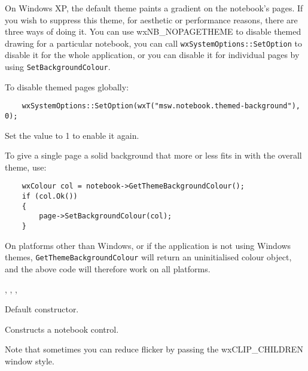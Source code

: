 
On Windows XP, the default theme paints a gradient on the notebook's pages.
If you wish to suppress this theme, for aesthetic or performance reasons,
there are three ways of doing it. You can use wxNB\_NOPAGETHEME to disable
themed drawing for a particular notebook, you can call {\tt wxSystemOptions::SetOption}
to disable it for the whole application, or you can disable it for individual
pages by using {\tt SetBackgroundColour}.

To disable themed pages globally:

\begin{verbatim}
    wxSystemOptions::SetOption(wxT("msw.notebook.themed-background"), 0);
\end{verbatim}

Set the value to 1 to enable it again.

To give a single page a solid background that more or less fits in with the
overall theme, use:

\begin{verbatim}
    wxColour col = notebook->GetThemeBackgroundColour();
    if (col.Ok())
    {
        page->SetBackgroundColour(col);
    }
\end{verbatim}

On platforms other than Windows, or if the application is not using Windows
themes, {\tt GetThemeBackgroundColour} will return an uninitialised colour object,
and the above code will therefore work on all platforms.


, , , \rtfsp


\label{wxnotebookctor}


Default constructor.


Constructs a notebook control.

Note that sometimes you can reduce flicker by passing the wxCLIP\_CHILDREN window style.

